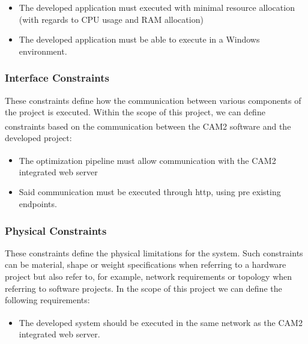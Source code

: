 \begin{itemize}
	\item The developed application must executed with minimal resource allocation (with regards to CPU usage and RAM allocation)
	\item The developed application must be able to execute in a Windows environment.
\end{itemize}



\subsubsection{Interface Constraints} 

These constraints define how the communication between various components of the project is executed. Within the scope of this project, we can define constraints based on the communication between the CAM2\textsuperscript{\textregistered} software and the developed project:

\begin{itemize}
	\item The optimization pipeline must allow communication with the CAM2\textsuperscript{\textregistered} integrated web server
	\item Said communication must be executed through \acrfull{http}, using pre existing endpoints.
\end{itemize}

\subsubsection{Physical Constraints}

These constraints define the physical limitations for the system. Such constraints can be material, shape or weight specifications when referring to a hardware project but also refer to, for example, network requirements or topology when referring to software projects. In the scope of this project we can define the following requirements:

\begin{itemize}
	\item The developed system should be executed in the same network as the CAM2\textsuperscript{\textregistered} integrated web server.
\end{itemize}
